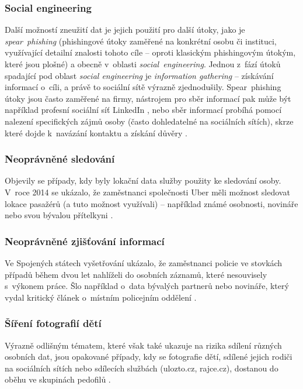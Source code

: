 \subsubsection*{Social engineering}
Další možností zneužití dat je jejich použití pro další útoky, jako je \textit{spear~phishing} (phishingové útoky zaměřené na konkrétní osobu či instituci, využívající detailní znalosti tohoto cíle -- oproti klasickým phishingovým útokým, které jsou plošné) a obecně v~oblasti \textit{social~engineering}. Jednou z~fází  útoků spadající pod oblast \textit{social engineering} je \textit{information gathering} -- získávání informací o~cíli, a právě to sociální sítě výrazně zjednodušily. Spear~phishing útoky jsou často zaměřené na firmy, nástrojem pro sběr informací pak může být například profesní sociální síť LinkedIn \citep{social-engineering-tools}, nebo sběr informací probíhá pomocí nalezení specifických zájmů osoby (často dohledatelné na sociálních sítích), skrze které dojde k~navázání kontaktu a získání důvěry \citep{social-engineering-book}.

\subsubsection*{Neoprávněné sledování}
Objevily se případy, kdy byly lokační data služby použity ke sledování osoby. V~roce 2014 se ukázalo, že zaměstnanci společnosti Uber měli možnost sledovat lokace pasažérů (a tuto možnost využívali) -- například známé osobnosti, novináře nebo svou bývalou přítelkyni \citep{uber-spying}.

\subsubsection*{Neoprávněné zjišťování informací}
Ve Spojených státech vyšetřování ukázalo, že zaměstnanci policie ve stovkách případů během dvou let nahlíželi do osobních záznamů, které nesouvisely s~výkonem práce. Šlo například o~data bývalých partnerů nebo novináře, který vydal kritický článek o~místním policejním oddělení \citep{police-spying}. 

\subsubsection*{Šíření fotografií dětí}
Výrazně odlišným tématem, které však také ukazuje na rizika sdílení různých osobních dat, jsou opakované případy, kdy se fotografie dětí, sdílené jejich rodiči na sociálních sítích nebo sdílecích službách (ulozto.cz, rajce.cz), dostanou do oběhu ve skupinách pedofilů \citep{pedophiles-web}.

